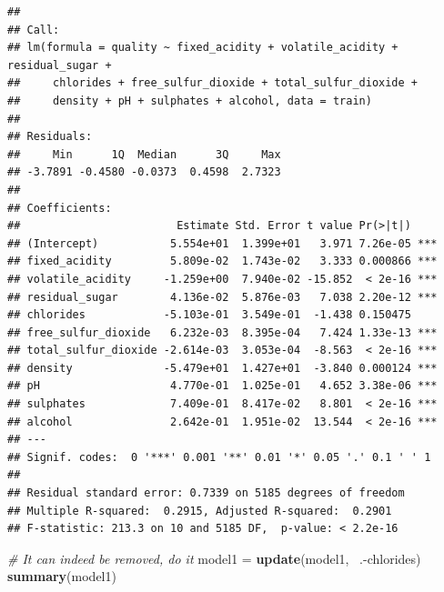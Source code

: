 \documentclass[12pt,]{article}
\newenvironment{Shaded}{\begin{snugshade}}{\end{snugshade}}
\newcommand{\KeywordTok}[1]{\textcolor[rgb]{0.13,0.29,0.53}{\textbf{{#1}}}}
\newcommand{\StringTok}[1]{\textcolor[rgb]{0.31,0.60,0.02}{{#1}}}
\newcommand{\CommentTok}[1]{\textcolor[rgb]{0.56,0.35,0.01}{\textit{{#1}}}}
\newcommand{\NormalTok}[1]{{#1}}
\begin{document}
\begin{verbatim}
## 
## Call:
## lm(formula = quality ~ fixed_acidity + volatile_acidity + residual_sugar + 
##     chlorides + free_sulfur_dioxide + total_sulfur_dioxide + 
##     density + pH + sulphates + alcohol, data = train)
## 
## Residuals:
##     Min      1Q  Median      3Q     Max 
## -3.7891 -0.4580 -0.0373  0.4598  2.7323 
## 
## Coefficients:
##                        Estimate Std. Error t value Pr(>|t|)    
## (Intercept)           5.554e+01  1.399e+01   3.971 7.26e-05 ***
## fixed_acidity         5.809e-02  1.743e-02   3.333 0.000866 ***
## volatile_acidity     -1.259e+00  7.940e-02 -15.852  < 2e-16 ***
## residual_sugar        4.136e-02  5.876e-03   7.038 2.20e-12 ***
## chlorides            -5.103e-01  3.549e-01  -1.438 0.150475    
## free_sulfur_dioxide   6.232e-03  8.395e-04   7.424 1.33e-13 ***
## total_sulfur_dioxide -2.614e-03  3.053e-04  -8.563  < 2e-16 ***
## density              -5.479e+01  1.427e+01  -3.840 0.000124 ***
## pH                    4.770e-01  1.025e-01   4.652 3.38e-06 ***
## sulphates             7.409e-01  8.417e-02   8.801  < 2e-16 ***
## alcohol               2.642e-01  1.951e-02  13.544  < 2e-16 ***
## ---
## Signif. codes:  0 '***' 0.001 '**' 0.01 '*' 0.05 '.' 0.1 ' ' 1
## 
## Residual standard error: 0.7339 on 5185 degrees of freedom
## Multiple R-squared:  0.2915, Adjusted R-squared:  0.2901 
## F-statistic: 213.3 on 10 and 5185 DF,  p-value: < 2.2e-16
\end{verbatim}

\begin{Shaded}
\begin{Highlighting}[]
\CommentTok{# It can indeed be removed, do it}
\NormalTok{model1 =}\StringTok{ }\KeywordTok{update}\NormalTok{(model1, ~.-chlorides)}
\KeywordTok{summary}\NormalTok{(model1)}
\end{Highlighting}
\end{Shaded}
\end{document}
